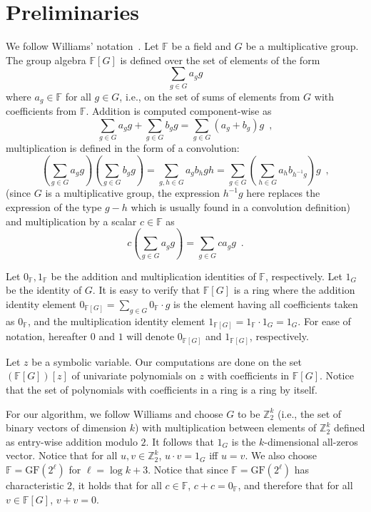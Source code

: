 \documentclass{llncs}
\newcommand{\FF}{\mathbb{F}}
\newcommand{\ZZ}{\mathbb{Z}}
\newcommand{\FG}{{\FF[G]}}
\newcommand{\GF}{\mathrm{GF}}
\begin{document}
\section{Preliminaries}\label{sec:prelim}
We follow Williams' notation~\cite{Williams09}. Let $\FF$ be a field and $G$ be a multiplicative group. The group algebra $\FF[G]$ is defined over the set of elements of the form
\begin{equation}
\sum_{g \in G}a_g g
\end{equation}
where $a_g \in \FF$ for all $g \in G$, i.e., on the set of sums of elements from $G$ with coefficients from $\FF$. 
Addition is computed component-wise as
\begin{equation}
\sum_{g \in G}a_g g + \sum_{g \in G}b_g g = \sum_{g \in G}(a_g + b_g) g \enspace,
\end{equation}
multiplication is defined in the form of a convolution:
\begin{equation}
\left(\sum_{g \in G}a_g g\right)  \left(\sum_{g \in G}b_g g\right) = \sum_{g,h \in G}a_g b_h gh = \sum_{g \in G} \left(\sum_{h \in G}  a_h b_{h^{-1} g} \right) g \enspace,
\end{equation}
(since $G$ is a multiplicative group, the expression $h^{-1} g$ here replaces the expression of the type $g-h$ which is usually found in a convolution definition) and multiplication by a scalar $c \in \FF$ as
\begin{equation}
c\left(\sum_{g \in G}a_g g\right) = \sum_{g \in G} c a_g g \enspace.
\end{equation}

Let $0_\FF, 1_\FF$ be the addition and multiplication identities of $\FF$, respectively. Let $1_G$ be the identity of $G$. It is easy to verify that $\FF[G]$ is a ring where the addition identity element $0_{\FF[G]}=\sum_{g \in G}0_\FF \cdot g$ is the element having all coefficients taken as $0_\FF$, and the multiplication identity element $1_{\FF[G]} = 1_\FF \cdot 1_G = 1_G$. For ease of notation, hereafter $0$ and $1$ will denote $0_{\FF[G]}$ and $1_{\FF[G]}$, respectively.

Let $z$ be a symbolic variable. Our computations are done on the set $(\FG)[z]$ of univariate polynomials on $z$ with coefficients in $\FF[G]$. Notice that the set of polynomials with coefficients in a ring is a ring by itself.

For our algorithm, we follow Williams and choose $G$ to be $\ZZ_2^k$ (i.e., the set of binary vectors of dimension $k$) with multiplication between elements of $\ZZ_2^k$ defined as entry-wise addition modulo $2$. It follows that $1_G$ is the $k$-dimensional all-zeros vector. Notice that for all $u,v \in \ZZ_2^k$, $u \cdot v = 1_G$ iff $u = v$. We also choose $\FF=\GF(2^\ell)$ for $\ell = \log k + 3$. Notice that since $\FF = \GF(2^\ell)$ has characteristic $2$, it holds that for all $c \in \FF$, $c + c = 0_\FF$, and therefore that for all $v \in \FG$, $v + v = 0$.
\end{document}
